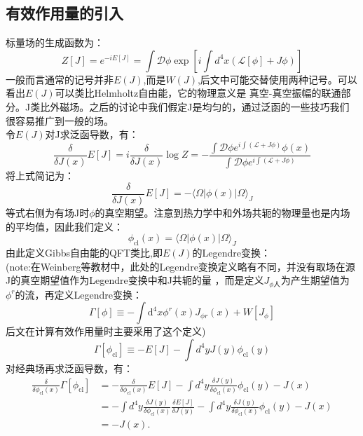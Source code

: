 \documentclass[12pt, a4paper, oneside]{ctexbook}
\def\hf{Helmholtz自由能}
\def\gf{Gibbs自由能}
\begin{document}
	\subsection{有效作用量的引入}
	 标量场的生成函数为：
	 \begin{equation}
		Z[J]=e^{-i E[J]}=\int \mathcal{D} \phi \exp \left[i \int d^4 x(\mathcal{L}[\phi]+J \phi)\right]
	 \end{equation}
	 一般而言通常的记号并非$ E(J) $,而是$ W(J) $,后文中可能交替使用两种记号。可以看出$ E(J) $可以类比\hf ，它的物理意义是
	 真空-真空振幅的联通部分。J类比外磁场。之后的讨论中我们假定J是均匀的，通过泛函的一些技巧我们很容易推广到一般的场。\\
	 令$ E(J) $对J求泛函导数，有：
	 \begin{equation}
		\frac{\delta}{\delta J(x)} E[J]=i \frac{\delta}{\delta J(x)} \log Z=-\frac{\int \mathcal{D} \phi e^{i \int(\mathcal{L}+J \phi)} \phi(x)}{\int \mathcal{D} \phi e^{i \int(\mathcal{L}+J \phi)}}
	 \end{equation}  
	将上式简记为：
	\begin{equation}
		\frac{\delta}{\delta J(x)} E[J]=-\langle\Omega|\phi(x)| \Omega\rangle_J
	\end{equation}
	等式右侧为有场J时$ \phi $的真空期望。注意到热力学中和外场共轭的物理量也是内场的平均值，因此我们定义：
	\begin{equation}
		\phi_{\mathrm{cl}}(x)=\langle\Omega|\phi(x)| \Omega\rangle_J
		\label{defofcf}
	\end{equation}
	由此定义\gf 的QFT类比,即$ E(J) $的Legendre变换：\\
	(note:在Weinberg等教材中，此处的Legendre变换定义略有不同，并没有取场在源J的真空期望值作为Legendre变换中和J共轭的量
	，而是定义$ J_{\phi 人} $为产生期望值为$ \phi^r $的流，再定义Legendre变换：
	\begin{equation}
		\Gamma[\phi] \equiv-\int \mathrm{d}^4 x \phi^r(x) J_{\phi r}(x)+W\left[J_\phi\right]
		\label{defofw}
	\end{equation}  
	后文在计算有效作用量时主要采用了这个定义)
	\begin{equation}
		\Gamma\left[\phi_{\mathrm{cl}}\right] \equiv-E[J]-\int d^4 y J(y) \phi_{\mathrm{cl}}(y)
		\label{defofea}
	\end{equation} 
	对经典场再求泛函导数，有：
	\begin{equation}
		\begin{aligned}
			\frac{\delta}{\delta \phi_{\mathrm{cl}}(x)} \Gamma\left[\phi_{\mathrm{cl}}\right] & =-\frac{\delta}{\delta \phi_{\mathrm{cl}}(x)} E[J]-\int d^4 y \frac{\delta J(y)}{\delta \phi_{\mathrm{cl}}(x)} \phi_{\mathrm{cl}}(y)-J(x) \\
			& =-\int d^4 y \frac{\delta J(y)}{\delta \phi_{\mathrm{cl}}(x)} \frac{\delta E[J]}{\delta J(y)}-\int d^4 y \frac{\delta J(y)}{\delta \phi_{\mathrm{cl}}(x)} \phi_{\mathrm{cl}}(y)-J(x) \\
			& =-J(x) .
			\end{aligned}
	\end{equation}
\end{document}
